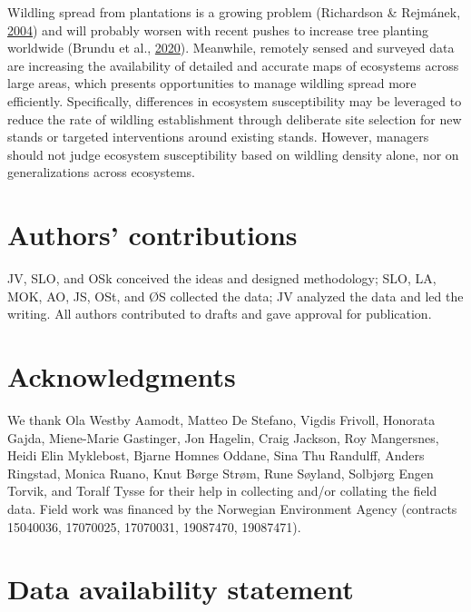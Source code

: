 \documentclass[
]{article}
\begin{document}
Wildling spread from plantations is a growing problem (Richardson \& Rejmánek, \protect\hyperlink{ref-richardsonConifersInvasiveAliens2004}{2004}) and will probably worsen with recent pushes to increase tree planting worldwide (Brundu et al., \protect\hyperlink{ref-brunduGlobalGuidelinesSustainable2020}{2020}).
Meanwhile, remotely sensed and surveyed data are increasing the availability of detailed and accurate maps of ecosystems across large areas, which presents opportunities to manage wildling spread more efficiently.
Specifically, differences in ecosystem susceptibility may be leveraged to
reduce the rate of wildling establishment through deliberate site selection for new stands or targeted interventions around existing stands.
However, managers should not judge ecosystem susceptibility based on wildling density alone, nor on generalizations across ecosystems.

\hypertarget{authors-contributions}{%
\section{Authors' contributions}\label{authors-contributions}}

JV, SLO, and OSk conceived the ideas and designed methodology; SLO, LA, MOK, AO, JS, OSt, and ØS collected the data; JV analyzed the data and led the writing. All authors contributed to drafts and gave approval for publication.

\hypertarget{acknowledgments}{%
\section{Acknowledgments}\label{acknowledgments}}

We thank Ola Westby Aamodt, Matteo De Stefano, Vigdis Frivoll, Honorata Gajda, Miene-Marie Gastinger, Jon Hagelin, Craig Jackson, Roy Mangersnes, Heidi Elin Myklebost, Bjarne Homnes Oddane, Sina Thu Randulff, Anders Ringstad, Monica Ruano, Knut Børge Strøm, Rune Søyland, Solbjørg Engen Torvik, and Toralf Tysse for their help in collecting and/or collating the field data. Field work was financed by the Norwegian Environment Agency (contracts 15040036, 17070025, 17070031, 19087470, 19087471).

\hypertarget{data-availability-statement}{%
\section{Data availability statement}\label{data-availability-statement}}
\end{document}
